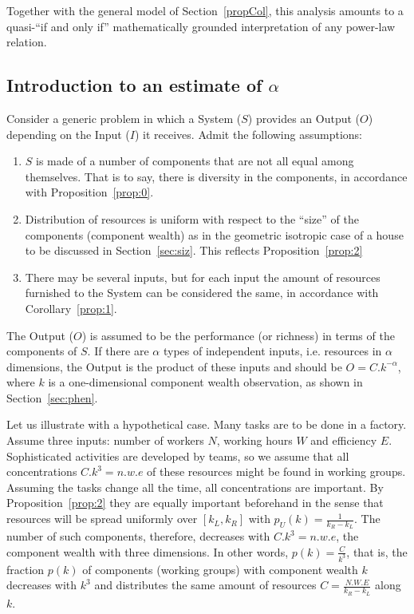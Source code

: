 \documentclass[10pt,letterpaper]{article}
\begin{document}
Together with the general model of Section~\ref{propCol}, this analysis amounts to a quasi-``if and only if'' mathematically grounded interpretation of any power-law relation.

\subsection{Introduction to an estimate of $\alpha$}
Consider a generic problem in which a System ($S$) provides an Output ($O$) depending on the Input ($I$) it receives.
Admit the following assumptions:
\begin{enumerate}
	\item $S$ is made of a number of components that are not all equal among themselves.
That is to say, there is diversity in the components, in accordance with Proposition~\ref{prop:0}. 
\item Distribution of resources is uniform with respect to the ``size'' of the components (component wealth) as in the geometric isotropic case of a house to be discussed in Section~\ref{sec:siz}.
This reflects Proposition~\ref{prop:2}
\item There may be several inputs, but for each input the amount of resources furnished to the System can be considered the same, 
	in accordance with Corollary~\ref{prop:1}.
\end{enumerate}

The Output ($O$)
is assumed to be the performance (or richness) in terms of the components of $S$.
If there are $\alpha$ types of independent inputs, i.e. resources in $\alpha$ dimensions,
the Output is the product of these inputs and should be
$O =C.k^{-\alpha}$, where $k$ is a one-dimensional component wealth observation,
as shown in Section~\ref{sec:phen}. 

Let us illustrate with a hypothetical case.
Many tasks are to be done in a factory.
Assume three inputs:
number of workers $N$, working hours $W$
and efficiency $E$.
Sophisticated activities are developed by teams,
so we assume that all concentrations $C.k^3=n.w.e$
of these resources might be found in working groups.
Assuming the tasks change all the time,
all concentrations are important.
By Proposition~\ref{prop:2} they are equally important beforehand
in the sense that 
resources will be spread uniformly over $[k_L,k_R]$
with $p_U(k)=\frac{1}{k_R-k_L}$.
The number of such components, therefore,
decreases with $C.k^3=n.w.e$, the component wealth with three dimensions.
In other words,
$p(k)=\frac{C}{k^3}$, that is,
the fraction $p(k)$ of components (working groups) with component wealth $k$
decreases with $k^3$ and distributes the same
amount of resources $C=\frac{N.W.E}{k_R-k_L}$ along $k$.
\end{document}
